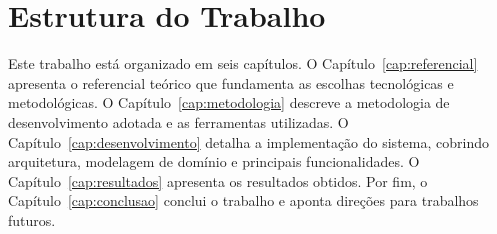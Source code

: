 \section{Estrutura do Trabalho}
\label{sec:estrutura}

Este trabalho está organizado em seis capítulos. O Capítulo~\ref{cap:referencial}
apresenta o referencial teórico que fundamenta as escolhas tecnológicas e
metodológicas. O Capítulo~\ref{cap:metodologia} descreve a metodologia de
desenvolvimento adotada e as ferramentas utilizadas. O
Capítulo~\ref{cap:desenvolvimento} detalha a implementação do sistema, cobrindo
arquitetura, modelagem de domínio e principais funcionalidades. O
Capítulo~\ref{cap:resultados} apresenta os resultados obtidos. Por fim, o
Capítulo~\ref{cap:conclusao} conclui o trabalho e aponta direções para trabalhos
futuros.
